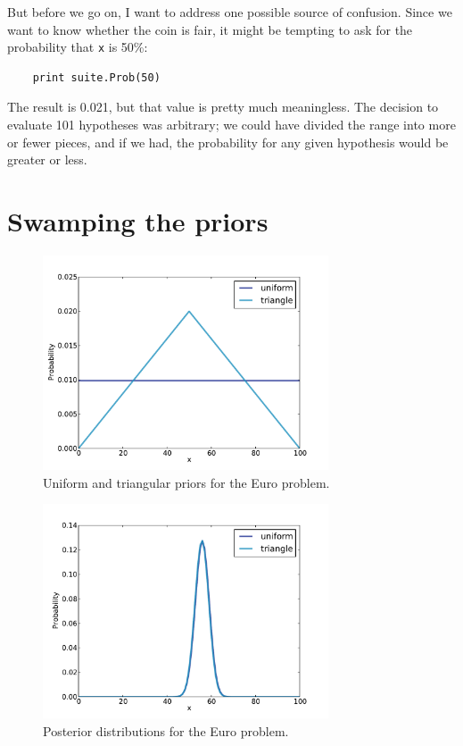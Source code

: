 \documentclass[12pt]{book}
\begin{document}
But before we go on, I want to address one possible source of confusion.
Since we want to know whether the coin is fair, it might be tempting
to ask for the probability that {\tt x} is 50\%:

\begin{verbatim}
    print suite.Prob(50)
\end{verbatim}

The result is 0.021, but that value is pretty much meaningless.  The
decision to evaluate 101 hypotheses was arbitrary; we could have
divided the range into more or fewer pieces, and if we had, the
probability for any given hypothesis would be greater or less.


\section{Swamping the priors}
\label{triangle}

\begin{figure}
\centerline{\includegraphics[height=2.5in]{figs/euro2.pdf}}
\caption{Uniform and triangular priors for the
Euro problem.}
\label{fig.euro2}
\end{figure}

\begin{figure}
\centerline{\includegraphics[height=2.5in]{figs/euro3.pdf}}
\caption{Posterior distributions for the Euro problem.}
\label{fig.euro3}
\end{figure}
\end{document}
